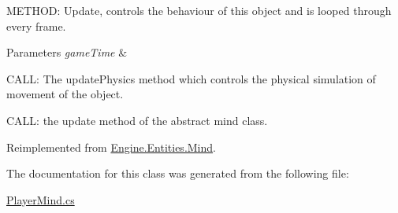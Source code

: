 M\+E\+T\+H\+OD\+: Update, controls the behaviour of this object and is looped through every frame. 


\begin{DoxyParams}{Parameters}
{\em game\+Time} & \\
\hline
\end{DoxyParams}
C\+A\+LL\+: The update\+Physics method which controls the physical simulation of movement of the object.

C\+A\+LL\+: the update method of the abstract mind class. 

Reimplemented from \hyperlink{a00318_adec6999d87accf7371de1536eac2541b}{Engine.\+Entities.\+Mind}.



The documentation for this class was generated from the following file\+:\begin{DoxyCompactItemize}
\item 
\hyperlink{a00026}{Player\+Mind.\+cs}\end{DoxyCompactItemize}
